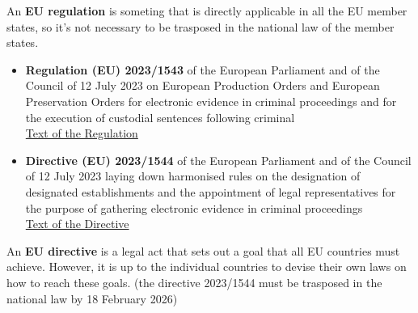 \begin{boxH}
  An \textbf{EU regulation} is someting that is directly applicable in all the EU member states, so it's not necessary to be trasposed in the national law of the member states.
\end{boxH}

\begin{itemize}
  \item \textbf{Regulation (EU) 2023/1543} of the European Parliament and of the Council of 12 July 2023 on European Production Orders and European Preservation Orders for electronic evidence in criminal proceedings and for the execution of custodial sentences following criminal \\ \href{https://eur-lex.europa.eu/legal-content/EN/TXT/?uri=CELEX%3A32023R1543}{Text of the Regulation}
  \item \textbf{Directive (EU) 2023/1544} of the European Parliament and of the Council of 12 July 2023 laying down harmonised rules on the designation of designated establishments and the appointment of legal representatives for the purpose of gathering electronic evidence in criminal proceedings \\ \href{https://eur-lex.europa.eu/legal-content/EN/TXT/?uri=CELEX%3A32023L1544}{Text of the Directive}
\end{itemize}

\begin{boxH}
  An \textbf{EU directive} is a legal act that sets out a goal that all EU countries must achieve. However, it is up to the individual countries to devise their own laws on how to reach these goals. (the directive 2023/1544 must be trasposed in the national law by 18 February 2026)
\end{boxH}                                                                                                                                                                                                                                                                                                                                                                                                                                                                                                                                                                                                                                                                                                                                                                                                                                                                                                                                                                                                                                                                            